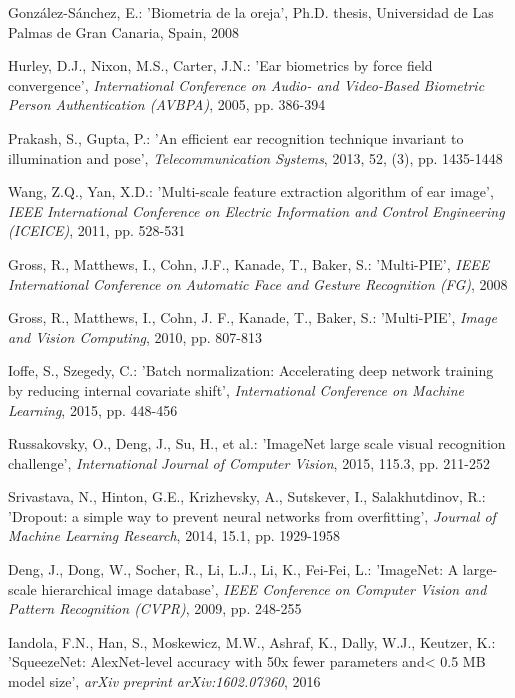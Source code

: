 \documentclass[11pt,journal,compsoc]{IEEEtran}
\begin{document}
\begin{thebibliography}{1}
Gonz\'{a}lez-S\'{a}nchez, E.: 'Biometria de la oreja', Ph.D. thesis, Universidad de Las Palmas de Gran Canaria, Spain, 2008

Hurley, D.J., Nixon, M.S., Carter, J.N.: 'Ear biometrics by force field convergence', \textit{International Conference on Audio- and Video-Based Biometric Person Authentication (AVBPA)}, 2005, pp. 386-394

Prakash, S., Gupta, P.: 'An efficient ear recognition technique invariant to illumination and pose', \textit{Telecommunication Systems}, 2013, {52}, (3), pp. 1435-1448

Wang, Z.Q., Yan, X.D.: 'Multi-scale feature extraction algorithm of ear image', \textit{IEEE International Conference on Electric Information and Control Engineering (ICEICE)}, 2011, pp. 528-531

Gross, R., Matthews, I., Cohn, J.F., Kanade, T., Baker, S.: 'Multi-PIE', \textit{IEEE International Conference on Automatic Face and Gesture Recognition (FG)}, 2008 

Gross, R., Matthews, I., Cohn, J. F., Kanade, T., Baker, S.: 'Multi-PIE', \textit{Image and Vision Computing}, 2010, pp. 807-813

Ioffe, S., Szegedy, C.: 'Batch normalization: Accelerating deep network training by reducing internal covariate shift', \textit{International Conference on Machine Learning}, 2015, pp. 448-456
 
Russakovsky, O., Deng, J., Su, H., et al.: 'ImageNet large scale visual recognition challenge', \textit{International Journal of Computer Vision}, 2015, {115.3}, pp. 211-252

Srivastava, N., Hinton, G.E., Krizhevsky, A., Sutskever, I., Salakhutdinov, R.: 'Dropout: a simple way to prevent neural networks from overfitting', \textit{Journal of Machine Learning Research}, 2014, 15.1, pp. 1929-1958

Deng, J., Dong, W., Socher, R., Li, L.J., Li, K., Fei-Fei, L.: 'ImageNet: A large-scale hierarchical image database', \textit{IEEE Conference on Computer Vision and Pattern Recognition (CVPR)}, 2009, pp. 248-255

Iandola, F.N., Han, S., Moskewicz, M.W., Ashraf, K., Dally, W.J., Keutzer, K.: 'SqueezeNet: AlexNet-level accuracy with 50x fewer parameters and< 0.5 MB model size', \textit{arXiv preprint arXiv:1602.07360}, 2016


\end{thebibliography}
\end{document}
